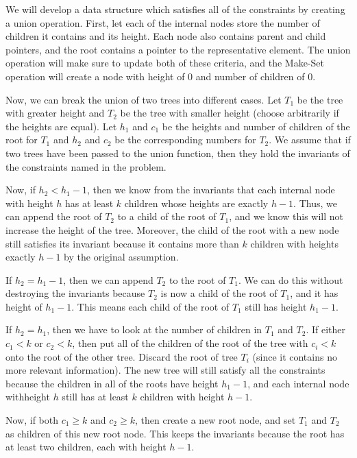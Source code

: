 \documentclass[psamsfonts]{amsart}
\newenvironment{sol}{{\bfseries Solution}}{\qedsymbol}
\theoremstyle{definition}
\theoremstyle{remark}
\numberwithin{equation}{section}
\begin{document}
\begin{sol}
We will develop a data structure which satisfies all of the constraints by creating a union operation. First, let each of the internal nodes store the number of children it contains and its height. Each node also contains parent and child pointers, and the root contains a pointer to the representative element. The union operation will make sure to update both of these criteria, and the Make-Set operation will create a node with height of 0 and number of children of 0. 

Now, we can break the union of two trees into different cases. Let $T_1$ be the tree with greater height and $T_2$ be the tree with smaller height (choose arbitrarily if the heights are equal). Let $h_1$ and $c_1$ be the heights and number of children of the root for $T_1$ and $h_2$ and $c_2$ be the corresponding numbers for $T_2$. We assume that if two trees have been passed to the union function, then they hold the invariants of the constraints named in the problem. 

Now, if $h_2 < h_1 - 1$, then we know from the invariants that each internal node with height $h$ has at least $k$ children whose heights are exactly $h - 1$. Thus, we can append the root of $T_2$ to a child of the root of $T_1$, and we know this will not increase the height of the tree. Moreover, the child of the root with a new node still satisfies its invariant because it contains more than $k$ children with heights exactly $h-1$ by the original assumption. 

If $h_2 = h_1 - 1$, then we can append $T_2$ to the root of $T_1$. We can do this without destroying the invariants because $T_2$ is now a child of the root of $T_1$, and it has height of $h_1 - 1$. This means each child of the root of $T_1$ still has height $h_1 - 1$. 

If $h_2 = h_1$, then we have to look at the number of children in $T_1$ and $T_2$. If either $c_1 < k$ or $c_2 < k$, then put all of the children of the root of the tree with $c_i < k$ onto the root of the other tree. Discard the root of tree $T_i$ (since it contains no more relevant information). The new tree will still satisfy all the constraints because the children in all of the roots have height $h_1 - 1$, and each internal node withheight $h$ still has at least $k$ children with height $h-1$. 

Now, if both $c_1 \geq k$ and $c_2 \geq k$, then create a new root node, and set $T_1$ and $T_2$ as children of this new root node. This keeps the invariants because the root has at least two children, each with height $h - 1$. 


\end{sol}
\end{document}
